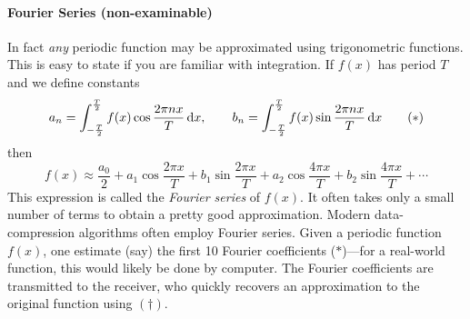 \paragraph{Fourier Series (non-examinable)}

In fact \emph{any} periodic function may be approximated using trigonometric functions. This is easy to state if you are familiar with integration. If $f(x)$ has period $T$ and we define constants
\[
	a_n=\int_{-\frac T2}^{\frac T2} f(x)\cos\frac{2\pi nx}T\,{\mathrm{d} x},\qquad 
	b_n=\int_{-\frac T2}^{\frac T2} f(x)\sin\frac{2\pi nx}T\,{\mathrm{d} x}
	\tag{$\ast$}
\]
then
\[
	f(x)\approx \frac{a_0}2+a_1\cos\frac{2\pi x}T +b_1\sin\frac{2\pi x}T +a_2\cos\frac{4\pi x}T +b_2\sin\frac{4\pi x}T +\cdots \tag{$\dag$}
\]
This expression is called the \emph{Fourier series} of $f(x)$. It often takes only a small number of terms to obtain a pretty good approximation. Modern data-compression algorithms often employ Fourier series. Given a periodic function $f(x)$, one estimate (say) the first 10 Fourier coefficients ($\ast$)---for a real-world function, this would likely be done by computer. The Fourier coefficients are transmitted to the receiver, who quickly recovers an approximation to the original function using $(\dag)$.


